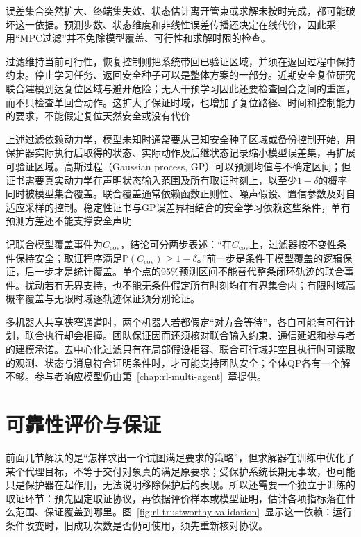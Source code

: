 误差集合突然扩大、终端集失效、状态估计离开管束或求解未按时完成，都可能破坏这一依据。预测步数、状态维度和非线性误差传播还决定在线代价，因此采用“MPC过滤”并不免除模型覆盖、可行性和求解时限的检查。

过滤维持当前可行性，恢复控制则把系统带回已验证区域，并须在返回过程中保持约束。停止学习任务、返回安全种子可以是整体方案的一部分。近期安全复位研究联合建模到达复位区域与避开危险；无人干预学习因此还要检查回合之间的重置，而不只检查单回合动作。这扩大了保证时域，也增加了复位路径、时间和控制能力的要求，不能假定复位天然安全或没有代价

上述过滤依赖动力学，模型未知时通常要从已知安全种子区域或备份控制开始，用保护器实际执行后取得的状态、实际动作及后继状态记录缩小模型误差集，再扩展可验证区域。高斯过程（Gaussian process, GP）可以预测均值与不确定区间；但证书需要真实动力学在声明状态输入范围及所有取证时刻上，以至少$1-\delta$的概率同时被模型集合覆盖。联合覆盖通常依赖函数正则性、噪声假设、置信参数及对自适应采样的控制。稳定性证书与GP误差界相结合的安全学习依赖这些条件，单有预测方差还不能支撑安全声明

记联合模型覆盖事件为$C_{\mathrm{cov}}$，结论可分两步表述：“在$C_{\mathrm{cov}}$上，过滤器按不变性条件保持安全；取证程序满足$\mathbb P(C_{\mathrm{cov}})\geq1-\delta$。”前一步是条件于模型覆盖的逻辑保证，后一步才是统计覆盖。单个点的95\%预测区间不能替代整条闭环轨迹的联合事件。扰动若有无界支持，也不能无条件假定所有时刻均在有界集合内；有限时域高概率覆盖与无限时域逐轨迹保证须分别论证。

多机器人共享狭窄通道时，两个机器人若都假定“对方会等待”，各自可能有可行计划，联合执行却会相撞。团队保证因而还须核对联合输入约束、通信延迟和参与者的建模承诺。去中心化过滤只有在局部假设相容、联合可行域非空且执行时可读取的观测、状态与消息符合证明条件时，才可能支持团队安全；个体QP各有一个解不够。参与者响应模型仍由第~\ref{chap:rl-multi-agent}~章提供。

\section{可靠性评价与保证}
\label{sec:rl-trustworthy-evidence}

前面几节解决的是“怎样求出一个试图满足要求的策略”，但求解器在训练中优化了某个代理目标，不等于交付对象真的满足原要求；受保护系统长期无事故，也可能只是保护器在起作用，无法说明移除保护后的表现。所以还需要一个独立于训练的取证环节：预先固定取证协议，再依据评价样本或模型证明，估计各项指标落在什么范围、保证覆盖到哪里。图~\ref{fig:rl-trustworthy-validation}~显示这一依赖：运行条件改变时，旧成功次数是否仍可使用，须先重新核对协议。

